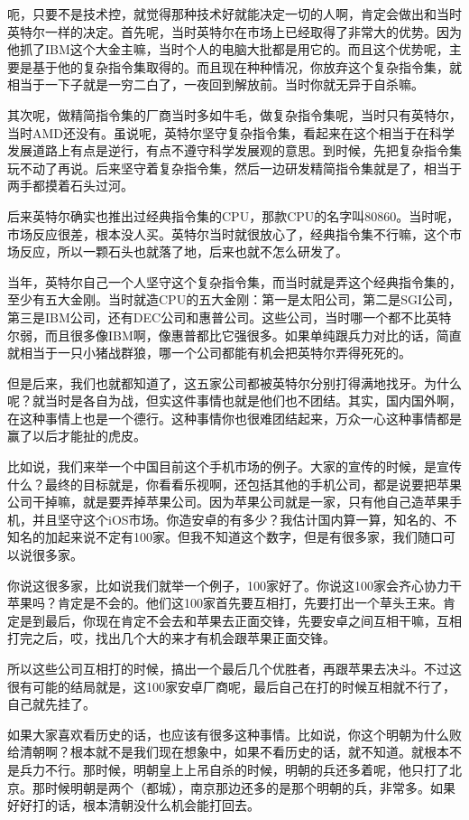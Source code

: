 \documentclass[
  letterpaper,
  DIV=11,
  numbers=noendperiod]{scrreprt}
\begin{document}
呃，只要不是技术控，就觉得那种技术好就能决定一切的人啊，肯定会做出和当时英特尔一样的决定。首先呢，当时英特尔在市场上已经取得了非常大的优势。因为他抓了IBM这个大金主嘛，当时个人的电脑大批都是用它的。而且这个优势呢，主要是基于他的复杂指令集取得的。而且现在种种情况，你放弃这个复杂指令集，就相当于一下子就是一穷二白了，一夜回到解放前。当时你就无异于自杀嘛。

其次呢，做精简指令集的厂商当时多如牛毛，做复杂指令集呢，当时只有英特尔，当时AMD还没有。虽说呢，英特尔坚守复杂指令集，看起来在这个相当于在科学发展道路上有点是逆行，有点不遵守科学发展观的意思。到时候，先把复杂指令集玩不动了再说。后来坚守着复杂指令集，然后一边研发精简指令集就是了，相当于两手都摸着石头过河。

后来英特尔确实也推出过经典指令集的CPU，那款CPU的名字叫80860。当时呢，市场反应很差，根本没人买。英特尔当时就很放心了，经典指令集不行嘛，这个市场反应，所以一颗石头也就落了地，后来也就不怎么研发了。

当年，英特尔自己一个人坚守这个复杂指令集，而当时就是弄这个经典指令集的，至少有五大金刚。当时就造CPU的五大金刚：第一是太阳公司，第二是SGI公司，第三是IBM公司，还有DEC公司和惠普公司。这些公司，当时哪一个都不比英特尔弱，而且很多像IBM啊，像惠普都比它强很多。如果单纯跟兵力对比的话，简直就相当于一只小猪战群狼，哪一个公司都能有机会把英特尔弄得死死的。

但是后来，我们也就都知道了，这五家公司都被英特尔分别打得满地找牙。为什么呢？就当时是各自为战，但实这件事情也就是他们也不团结。其实，国内国外啊，在这种事情上也是一个德行。这种事情你也很难团结起来，万众一心这种事情都是赢了以后才能扯的虎皮。

比如说，我们来举一个中国目前这个手机市场的例子。大家的宣传的时候，是宣传什么？最终的目标就是，你看看乐视啊，还包括其他的手机公司，都是说要把苹果公司干掉嘛，就是要弄掉苹果公司。因为苹果公司就是一家，只有他自己造苹果手机，并且坚守这个iOS市场。你造安卓的有多少？我估计国内算一算，知名的、不知名的加起来说不定有100家。但我不知道这个数字，但是有很多家，我们随口可以说很多家。

你说这很多家，比如说我们就举一个例子，100家好了。你说这100家会齐心协力干苹果吗？肯定是不会的。他们这100家首先要互相打，先要打出一个草头王来。肯定是到最后，你现在肯定不会去和苹果去正面交锋，先要安卓之间互相干嘛，互相打完之后，哎，找出几个大的来才有机会跟苹果正面交锋。

所以这些公司互相打的时候，搞出一个最后几个优胜者，再跟苹果去决斗。不过这很有可能的结局就是，这100家安卓厂商呢，最后自己在打的时候互相就不行了，自己就先挂了。

如果大家喜欢看历史的话，也应该有很多这种事情。比如说，你这个明朝为什么败给清朝啊？根本就不是我们现在想象中，如果不看历史的话，就不知道。就根本不是兵力不行。那时候，明朝皇上上吊自杀的时候，明朝的兵还多着呢，他只打了北京。那时候明朝是两个（都城），南京那边还多的是那个明朝的兵，非常多。如果好好打的话，根本清朝没什么机会能打回去。
\end{document}
